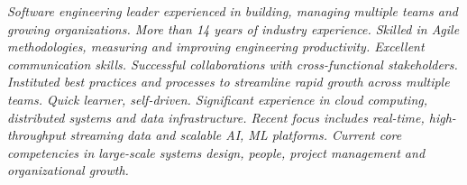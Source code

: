 {\selectfont
	\begin{justify}\textit{Software engineering leader experienced in building, managing multiple teams and growing organizations. More than 14 years of industry experience. Skilled in Agile methodologies, measuring and improving engineering productivity. Excellent communication skills. Successful collaborations with cross-functional stakeholders. Instituted best practices and processes to streamline rapid growth across multiple teams. Quick learner, self-driven. Significant experience in cloud computing, distributed systems and data infrastructure. Recent focus includes real-time, high-throughput streaming data and scalable AI, ML platforms. Current core competencies in large-scale systems design, people, project management and organizational growth.}\end{justify}
}
\vspace{-12pt}